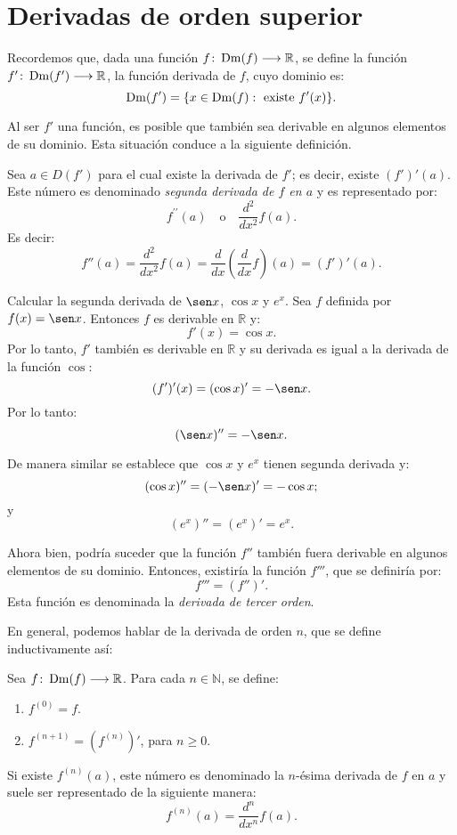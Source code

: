 \section{Derivadas de orden superior}

Recordemos que, dada una función $f\colon \operatorname{Dm}(f)\longrightarrow \mathbb{R}$, se define la función
$f'\colon \operatorname{Dm}(f')\longrightarrow \mathbb{R}$, la función derivada de $f$, cuyo dominio es:
\begin{equation*}
	\Dm(f')=\{x\in \Dm(f) : \ \text{existe} \ f'(x)\}.
\end{equation*}

Al ser $f'$ una función, es posible que también sea derivable en algunos elementos de su dominio.
Esta situación conduce a la siguiente definición.

\begin{defical}
Sea $a\in D(f')$ para el cual existe la derivada de $f'$; es decir, existe $(f')'(a)$. Este número
es denominado \emph{segunda derivada de $f$ en $a$} y es representado por:
\[
f^{\prime\prime}(a) \quad\text{o}\quad \frac{d^{2}}{d x^{2}}f(a).
\]
Es decir:
\begin{equation*}
	f''(a)=\frac{d^{2}}{d x^{2}}f(a)=\frac{d}{d x}\left(\frac{d}{d x}f\right)(a)=(f')'(a).
\end{equation*}
\end{defical}

\begin{exemplo}[Solución]{%
Calcular la segunda derivada de $\sen x$, $\cos x$ y $e^x$.
}%
Sea $f$ definida por $f(x) = \sen x$. Entonces $f$ es derivable en $\mathbb{R}$ y:
\[
f'(x) = \cos x.
\]
Por lo tanto, $f'$ también es derivable en $\mathbb{R}$ y su derivada es igual a la derivada de la
función $\cos$:
\[
(f')'(x) = (\cos x)' = -\sen x.
\]
Por lo tanto:
\[
(\sen x)'' = -\sen x.
\]

De manera similar se establece que $\cos x$ y $e^x$ tienen segunda derivada y:
\[
(\cos x)'' = (-\sen x)' = -\cos x;
\]
y
\[
(e^x)'' = (e^x)' = e^x.
\]
\end{exemplo}

Ahora bien, podría suceder que la función $f''$ también fuera derivable en algunos elementos de su
dominio. Entonces, existiría la función $f'''$, que se definiría por:
\[
f''' = (f'')'.
\]
Esta función es denominada la \emph{derivada de tercer orden}.

En general, podemos hablar de la derivada de orden $n$, que se define inductivamente así:

\begin{defical}
Sea $f\colon \operatorname{Dm}(f) \longrightarrow \mathbb{R}$. Para cada $n\in\mathbb{N}$, se define:
\begin{enumerate}
\item $f^{(0)} = f$.
\item $f^{(n+1)} = (f^{(n)})'$, para $n \geq 0$.
\end{enumerate}
Si existe $f^{(n)}(a)$, este número es denominado la $n$-ésima derivada de $f$ en $a$ y suele ser
representado de la siguiente manera:
\[
f^{(n)}(a) = \frac{d^n}{dx^n}f(a).
\]
\end{defical}

